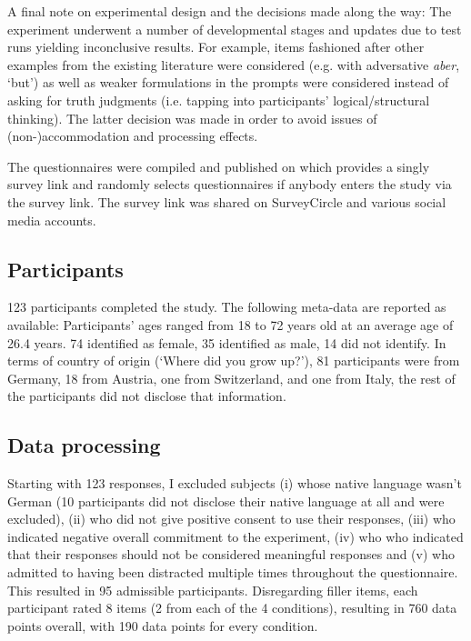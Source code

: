 \documentclass[output=paper
,modfonts
,nonflat]{langsci/langscibook}
\begin{document}
A final note on experimental design and the decisions made along the way: The experiment underwent a number of developmental stages and updates due to test runs yielding inconclusive results. For example, items fashioned after other examples from the existing literature were considered (e.g.  with adversative \textit{aber}, `but') as well as weaker formulations in the prompts were considered instead of asking for truth judgments (i.e. tapping into participants' logical/structural thinking). The latter decision was made in order to avoid issues of \linebreak(non-)accommodation and processing effects.

The questionnaires were compiled and published on \citet{sosci_website} which provides a singly survey link and randomly selects questionnaires if anybody enters the study via the survey link. The survey link was shared on SurveyCircle \citep{survey_circle_website} and various social media accounts. 

\subsection{Participants}

123 participants completed the study. The following meta-data are reported as available: Participants' ages ranged from 18 to 72 years old at an average age of 26.4 years. 74 identified as female, 35 identified as male, 14 did not identify. In terms of country of origin (`Where did you grow up?'), 81 participants were from Germany, 18 from Austria, one from Switzerland, and one from Italy, the rest of the participants did not disclose that information.

\subsection{Data processing}

Starting with 123 responses, I excluded subjects (i) whose native language wasn't German (10 participants did not disclose their native language at all and were excluded), (ii) who did not give positive consent to use their responses, (iii) who indicated negative overall commitment to the experiment, (iv) who who indicated that their responses should not be considered meaningful responses and (v) who admitted to having been distracted multiple times throughout the questionnaire. This resulted in 95 admissible participants. Disregarding filler items, each participant rated 8 items (2 from each of the 4 conditions), resulting in 760 data points overall, with 190 data points for every condition.
\end{document}
